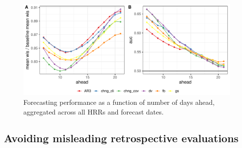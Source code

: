 \documentclass[9pt,twocolumn,twoside,lineno]{pnas-new}
\begin{document}



\begin{figure}[tb!]
  \centering
  \includegraphics[width=\linewidth]{fig/figure5.pdf}
  \caption{\label{fig:topline-overall-results}  Forecasting performance as a
    function of number of days 
    ahead, aggregated across all HRRs and forecast dates. }
\end{figure}

\subsection{Avoiding misleading retrospective evaluations}
\end{document}

